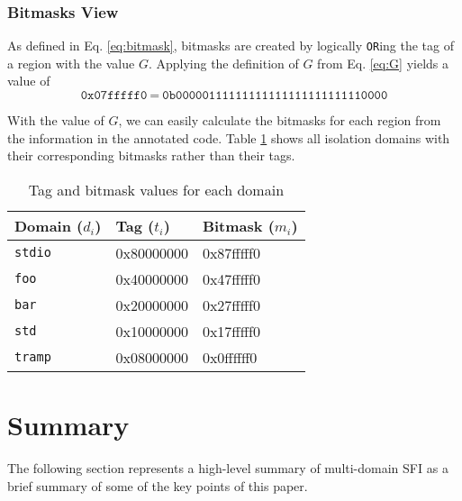 \documentclass[12pt]{article}
\begin{document}
\subsubsection{Bitmasks View}

As defined in Eq.  \ref{eq:bitmask}, bitmasks are created by logically \texttt{OR}ing the tag of a region with the value $G$. Applying the definition of $G$ from Eq. \ref{eq:G} yields a value of
$$ \texttt{0x07fffff0}\ =\ \texttt{0b00000111111111111111111111110000} $$

With the value of $G$, we can easily calculate the bitmasks for each region from the information in the annotated code. Table \ref{tbl:masks} shows all isolation domains with their corresponding bitmasks rather than their tags.

\begin{table}[H]
\centering
\begin{tabular}{@{}lll@{}}
\rowcolor[HTML]{EFEFEF} 
\textbf{Domain ($d_i$)} & \textbf{Tag ($t_i$)} & \textbf{Bitmask ($m_i$)} \\ \midrule
\texttt{stdio}          & 0x80000000           & 0x87fffff0               \\
\rowcolor[HTML]{EFEFEF} 
\texttt{foo}            & 0x40000000           & 0x47fffff0               \\
\texttt{bar}            & 0x20000000           & 0x27fffff0               \\
\rowcolor[HTML]{EFEFEF} 
\texttt{std}            & 0x10000000           & 0x17fffff0               \\
\texttt{tramp}          & 0x08000000           & 0x0ffffff0              
\end{tabular}

\caption{Tag and bitmask values for each domain}
\label{tbl:masks}
\end{table}

\section{Summary}

The following section represents a high-level summary of multi-domain SFI as a brief summary of some of the key points of this paper.
\end{document}
